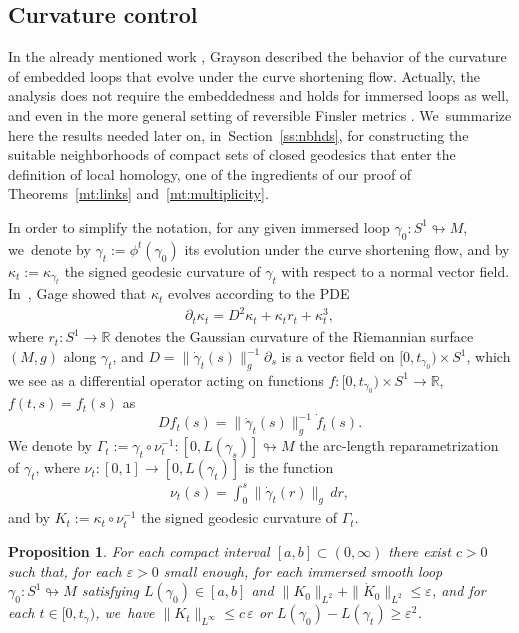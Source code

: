 \documentclass[JEP,XML,SOM,Unicode,NoFloatCountersInSection,published]{cedram}
\let\epsilon\varepsilon
\newcommand{\R}{\mathbb{R}}
\theoremstyle{plain}
\newtheorem{Prop}[Thm]{Proposition}
\theoremstyle{definition}
\begin{document}
\subsection{Curvature control}\label{ss:curvature}

In the already mentioned work \cite{Grayson:1989aa}, Grayson described the behavior of the curvature of embedded loops that evolve under the curve shortening flow. Actually, the analysis does not require the embeddedness and holds for immersed loops as well, and even in the more general setting of reversible Finsler metrics \cite[\S 2.5]{De-Philippis:2022aa}. We~summarize here the results needed later on, in~Section~\ref{ss:nbhds}, for constructing the suitable neighborhoods of compact sets of closed geodesics that enter the definition of local homology, one of the ingredients of our proof of Theorems~\ref{mt:links} and~\ref{mt:multiplicity}.

In order to simplify the notation, for any given immersed loop $\gamma_0:S^1\looparrowright M$, we~denote by $\gamma_t:=\phi^t(\gamma_0)$ its evolution under the curve shortening flow, and by $\kappa_t:=\kappa_{\gamma_t}$ the signed geodesic curvature of $\gamma_t$ with respect to a normal vector field. In~\cite[Lem.\,1.2]{Gage:1990aa}, Gage showed that $\kappa_t$ evolves according to the PDE
\begin{align}
\label{e:PDE_curvature}
\partial_t\kappa_t=D^2\kappa_t+\kappa_t r_t+\kappa_t^3,
\end{align}
where $r_t:S^1\to\R$ denotes the Gaussian curvature of the Riemannian surface $(M,g)$ along $\gamma_t$, and $D=\|\dot\gamma_t(s)\|_g^{-1}\partial_s$ is a vector field on $[0,t_{\gamma_0})\times S^1$, which we see as a differential operator acting on functions $f:[0,t_{\gamma_0})\times S^1\to\R$, $f(t,s)=f_t(s)$ as
\[
Df_t(s)=\|\dot\gamma_t(s)\|_g^{-1}\dot f_t(s).
\]
We denote by $\Gamma_t:=\gamma_t\circ\nu_t^{-1}:[0,L(\gamma_s)]\looparrowright M$ the arc-length reparametrization of $\gamma_t$, where $\nu_t:[0,1]\to[0,L(\gamma_t)]$ is the function
\begin{align*}
\nu_t(s) = \int_0^s \|\dot\gamma_t(r)\|_g\,dr,
\end{align*}
and by $K_t:=\kappa_t\circ\nu_t^{-1}$ the signed geodesic curvature of $\Gamma_t$.

\begin{Prop}\label{p:curvature_control}
For each compact interval $[a,b]\subset(0,\infty)$ there exist $c>0$ such that, for each $\epsilon>0$ small enough, for each immersed smooth loop $\gamma_0:S^1\looparrowright M$ satisfying $L(\gamma_0)\in[a,b]$ and $\|K_0\|_{L^2}+\|\dot K_0\|_{L^2}\leq\epsilon$, and for each $t\in[0,t_\gamma)$, we~have $\|K_t\|_{L^\infty}\leq c\,\epsilon$ or $L(\gamma_0)-L(\gamma_t)\geq \epsilon^2$.
\end{Prop}
\end{document}
